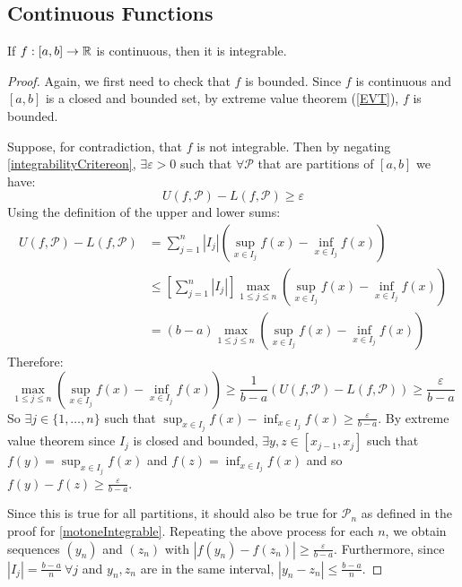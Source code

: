\documentclass[../main.tex]{subfiles}
\begin{document}
\subsection{Continuous Functions}
\begin{proposition}
  If $f: [a, b] \to \mathbb{R}$ is continuous, then it is integrable.
  \label{continuousIntegrable}
\end{proposition}
\begin{proof}
  Again, we first need to check that $f$ is bounded.
  Since $f$ is continuous and $[a, b]$ is a closed and bounded set, by extreme value theorem (\cref{EVT}), $f$ is bounded.

  Suppose, for contradiction, that $f$ is not integrable.
  Then by negating \cref{integrabilityCritereon}, $\exists \varepsilon > 0$ such that $\forall \mathcal{P}$ that are partitions of $[a, b]$ we have:
  \[
    U(f, \mathcal{P}) - L(f, \mathcal{P}) \geq \varepsilon
  \]
  Using the definition of the upper and lower sums:
  \begin{align*}
    U(f, \mathcal{P}) - L(f, \mathcal{P}) &= \sum_{j = 1}^{n} |I_j|\left(\sup_{x \in I_j} f(x) - \inf_{x \in I_j} f(x)\right) \\
                                          &\leq \left[\sum_{j = 1}^{n} |I_j|\right] \max\limits_{1 \leq j \leq n}\left(\sup_{x \in I_j} f(x) - \inf_{x \in I_j} f(x)\right) \\
                                          &= (b - a)\max\limits_{1 \leq j \leq n}\left(\sup_{x \in I_j} f(x) - \inf_{x \in I_j} f(x)\right)
  \end{align*}
  Therefore:
  \[
    \max\limits_{1 \leq j \leq n}\left(\sup_{x \in I_j} f(x) - \inf_{x \in I_j} f(x)\right) \geq \frac{1}{b - a}(U(f, \mathcal{P}) - L(f, \mathcal{P})) \geq \frac{\varepsilon}{b - a}
  \]
  So $\exists j \in \{1, \ldots, n\}$ such that $\sup_{x \in I_j} f(x) - \inf_{x \in I_j} f(x) \geq \frac{\varepsilon}{b - a}$.
  By extreme value theorem since $I_j$ is closed and bounded, $\exists y, z \in [x_{j - 1}, x_j]$ such that $f(y) = \sup_{x \in I_j} f(x)$ and $f(z) = \inf_{x \in I_j} f(x)$ and so $f(y) - f(z) \geq \frac{\varepsilon}{b - a}$.

  Since this is true for all partitions, it should also be true for $\mathcal{P}_n$ as defined in the proof for \cref{motoneIntegrable}.
  Repeating the above process for each $n$, we obtain sequences $(y_n)$ and $(z_n)$ with $|f(y_n) - f(z_n)| \geq \frac{\varepsilon}{b - a}$.
  Furthermore, since $|I_j| = \frac{b - a}{n}\ \forall j$ and $y_n, z_n$ are in the same interval, $|y_n - z_n| \leq \frac{b - a}{n}$.


\end{proof}
\end{document}
